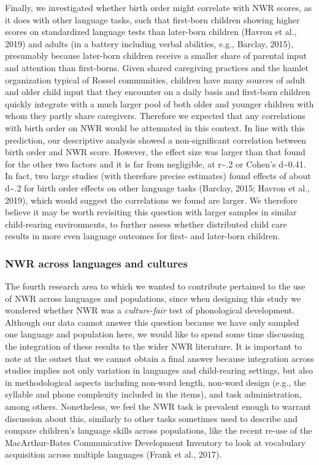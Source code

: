 \documentclass[
  american,
  ,man,floatsintext]{apa6}
\begin{document}
Finally, we investigated whether birth order might correlate with NWR scores, as it does with other language tasks, such that first-born children showing higher scores on standardized language tests than later-born children (Havron et al., 2019) and adults (in a battery including verbal abilities, e.g., Barclay, 2015), presumably because later-born children receive a smaller share of parental input and attention than first-borns. Given shared caregiving practices and the hamlet organization typical of Rossel communities, children have many sources of adult and older child input that they encounter on a daily basis and first-born children quickly integrate with a much larger pool of both older and younger children with whom they partly share caregivers. Therefore we expected that any correlations with birth order on NWR would be attenuated in this context. In line with this prediction, our descriptive analysis showed a non-significant correlation between birth order and NWR score. However, the effect size was larger than that found for the other two factors and it is far from negligible, at r\textasciitilde.2 or Cohen's d\textasciitilde0.41. In fact, two large studies (with therefore precise estimates) found effects of about d\textasciitilde.2 for birth order effects on other language tasks (Barclay, 2015; Havron et al., 2019), which would suggest the correlations we found are larger. We therefore believe it may be worth revisiting this question with larger samples in similar child-rearing environments, to further assess whether distributed child care results in more even language outcomes for first- and later-born children.

\hypertarget{nwr-across-languages-and-cultures}{%
\subsubsection{NWR across languages and cultures}\label{nwr-across-languages-and-cultures}}

The fourth research area to which we wanted to contribute pertained to the use of NWR across languages and populations, since when designing this study we wondered whether NWR was a \emph{culture-fair} test of phonological development. Although our data cannot answer this question because we have only sampled one language and population here, we would like to spend some time discussing the integration of these results to the wider NWR literature. It is important to note at the outset that we cannot obtain a final answer because integration across studies implies not only variation in languages and child-rearing settings, but also in methodological aspects including non-word length, non-word design (e.g., the syllable and phone complexity included in the items), and task administration, among others. Nonetheless, we feel the NWR task is prevalent enough to warrant discussion about this, similarly to other tasks sometimes used to describe and compare children's language skills across populations, like the recent re-use of the MacArthur-Bates Communicative Development Inventory to look at vocabulary acquisition across multiple languages (Frank et al., 2017).
\end{document}
